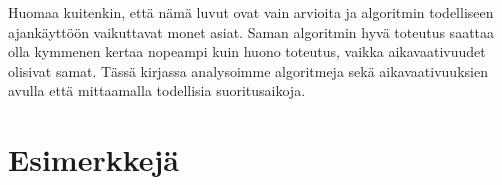 Huomaa kuitenkin, että nämä luvut ovat vain arvioita ja algoritmin
todelliseen ajankäyttöön vaikuttavat monet asiat.
Saman algoritmin hyvä toteutus saattaa olla
kymmenen kertaa nopeampi kuin huono toteutus,
vaikka aikavaativuudet olisivat samat.
Tässä kirjassa analysoimme algoritmeja sekä aikavaativuuksien
avulla että mittaamalla todellisia suoritusaikoja.

\section{Esimerkkejä}
